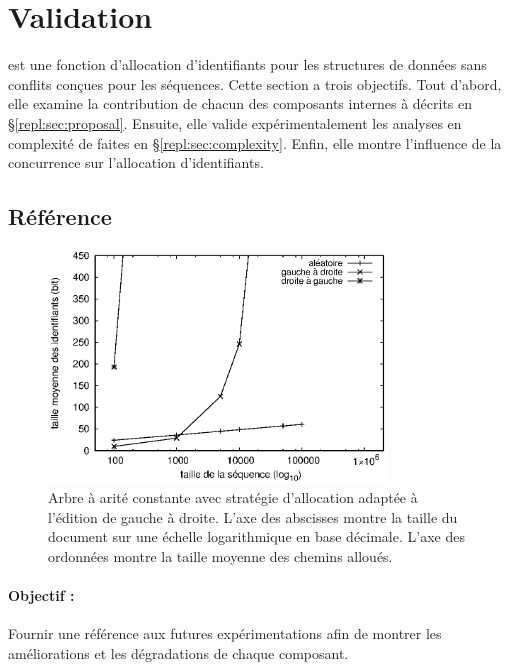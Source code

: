 
\section{Validation}
\label{repl:sec:validation}

\LSEQ est une fonction d'allocation d'identifiants pour les structures de
données sans conflits conçues pour les séquences.  Cette section a trois
objectifs. Tout d'abord, elle examine la contribution de chacun des composants
internes à \LSEQ décrits en §\ref{repl:sec:proposal}.  Ensuite, elle valide
expérimentalement les analyses en complexité de \LSEQ faites en
§\ref{repl:sec:complexity}.  Enfin, elle montre l'influence de la concurrence
sur l'allocation d'identifiants.

\subsection{Référence}

\begin{figure}
  \begin{center}
    \includegraphics[width=0.8\textwidth]{img/lseq/logoot.eps}
    \caption[Mesures de référence de la taille des chemins]
    {\label{repl:img:logoot} Arbre à arité constante avec stratégie d'allocation
      adaptée à l'édition de gauche à droite. L'axe des abscisses montre la
      taille du document sur une échelle logarithmique en base décimale. L'axe
      des ordonnées montre la taille moyenne des chemins alloués.}
  \end{center}
\end{figure}


\paragraph{Objectif :} Fournir une référence aux futures expérimentations afin
de montrer les améliorations et les dégradations de chaque composant.

